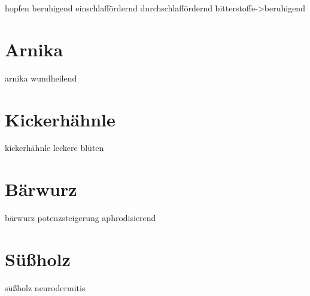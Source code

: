 hopfen
beruhigend
einschlaffördernd
durchschlaffördernd
bitterstoffe->beruhigend




\section{Arnika}
\label{   }


	
arnika
wundheilend



\section{Kickerhähnle}
\label{   }


kickerhähnle
leckere blüten




\section{Bärwurz}
\label{   }

bärwurz
potenzsteigerung
aphrodisierend



\section{Süßholz}
\label{   }


süßholz
neurodermitis



